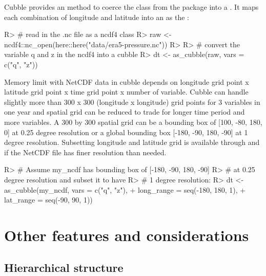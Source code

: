 \documentclass[
]{jss}
\begin{document}
Cubble provides an  method to coerce the 
class from the  package into a . It maps each
combination of longitude and latitude into an  as the
:

\begin{CodeChunk}
\begin{CodeInput}
R> # read in the .nc file as a ncdf4 class
R> raw <- ncdf4::nc_open(here::here("data/era5-pressure.nc"))
R> 
R> # convert the variable q and z in the ncdf4 into a cubble
R> dt <- as_cubble(raw, vars = c("q", "z"))
\end{CodeInput}
\end{CodeChunk}

Memory limit with NetCDF data in cubble depends on longitude grid point
x latitude grid point x time grid point x number of variable. Cubble can
handle slightly more than 300 x 300 (longitude x longitude) grid points
for 3 variables in one year and spatial grid can be reduced to trade for
longer time period and more variables. A 300 by 300 spatial grid can be
a bounding box of {[}100, -80, 180, 0{]} at 0.25 degree resolution or a
global bounding box {[}-180, -90, 180, -90{]} at 1 degree resolution.
Subsetting longitude and latitude grid is available through
 and  if the NetCDF file has finer
resolution than needed.

\begin{CodeChunk}
\begin{CodeInput}
R> # Assume my_ncdf has bounding box of [-180, -90, 180, -90] 
R> # at 0.25 degree resolution and subset it to have 
R> # 1 degree resolution:
R> dt <- as_cubble(my_ncdf, vars = c("q", "z"), 
+                 long_range = seq(-180, 180, 1), 
+                 lat_range = seq(-90, 90, 1))
\end{CodeInput}
\end{CodeChunk}

\hypertarget{other-features-and-considerations}{%
\section{Other features and
considerations}\label{other-features-and-considerations}}

\hypertarget{hierarchical-structure}{%
\subsection{Hierarchical structure}\label{hierarchical-structure}}
\end{document}
